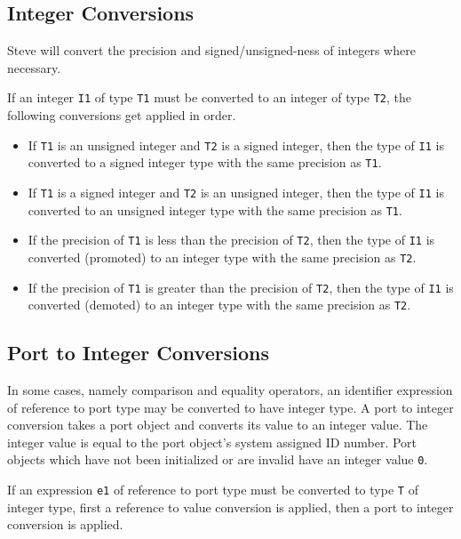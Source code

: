 \subsection{Integer Conversions} \label{int_conv}

Steve will convert the precision and signed/unsigned-ness of integers where necessary.

If an integer \texttt{I1} of type \texttt{T1} must be converted to an integer of type \texttt{T2}, the following conversions get applied in order.

\begin{itemize}
\item If \texttt{T1} is an unsigned integer and \texttt{T2} is a signed integer, then the type of \texttt{I1} is converted to a signed integer type with the same precision as \texttt{T1}.

\item If \texttt{T1} is a signed integer and \texttt{T2} is an unsigned integer, then the type of \texttt{I1} is converted to an unsigned integer type with the same precision as \texttt{T1}.

\item If the precision of \texttt{T1} is less than the precision of \texttt{T2}, then the type of \texttt{I1} is converted (promoted) to an integer type with the same precision as \texttt{T2}.

\item If the precision of \texttt{T1} is greater than the precision of \texttt{T2}, then the type of \texttt{I1} is converted (demoted) to an integer type with the same precision as \texttt{T2}.
\end{itemize}

\subsection{Port to Integer Conversions} \label{port_conv}

In some cases, namely comparison and equality operators, an identifier expression of reference to port type may be converted to have integer type. A port to integer conversion takes a port object and converts its value to an integer value. The integer value is equal to the port object's system assigned ID number. Port objects which have not been initialized or are invalid have an integer value \texttt{0}.

If an expression \texttt{e1} of reference to port type must be converted to type \texttt{T} of integer type, first a reference to value conversion is applied, then a port to integer conversion is applied.

